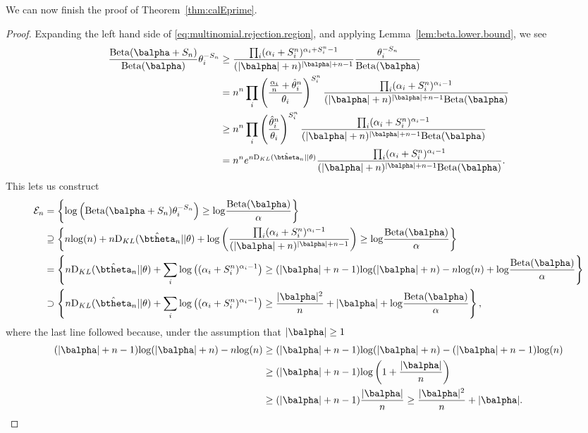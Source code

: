 \documentclass[11pt]{article}
\def\log{{\rm log}}
\newcommand{\Beta}{\mathrm{Beta}}
\newcommand{\KL}{\mathrm{D}_{KL}}
\begin{document}
We can now finish the proof of Theorem~\ref{thm:calEprime}.
\begin{proof}
Expanding the left hand side of \eqref{eq:multinomial.rejection.region}, and applying Lemma~\ref{lem:beta.lower.bound}, we see
\begin{align*}
    \frac{\Beta(\balpha + S_n)}
  {\Beta(\balpha)} \theta_i^{-S_n}
  &\geq
    \frac{ \prod_i (\alpha_i+S_i^n)^{\alpha_i + S_i^n-1}}
    {(|\balpha|+n)^{|\balpha| + n - 1}}
    \frac{ \theta_i^{-S_n}}{\Beta(\balpha)}\\
  &=
    n^n
    \prod_i
    \left(
    \frac{\frac{\alpha_i}{n} + \hat \theta_i^n}{\theta_i}\right)^{S_i^n}
    \frac{
    \prod_i
    (\alpha_i + S_i^n)^{\alpha_i - 1}
    }
    {(|\balpha|+n)^{|\balpha|+n-1}\Beta(\balpha)}\\
  &\geq
    n^n
    \prod_i
    \left(
    \frac{\hat \theta_i^n}{\theta_i}\right)^{S_i^n}
    \frac{
    \prod_i
    (\alpha_i + S_i^n)^{\alpha_i - 1}
    }
    {(|\balpha|+n)^{|\balpha|+n-1}\Beta(\balpha)}\\
  &=
    n^n
    e^{n \KL(\hat\btheta_n|| \theta) }
    \frac{
    \prod_i
    (\alpha_i + S_i^n)^{\alpha_i - 1}
    }
    {(|\balpha|+n)^{|\balpha|+n-1}\Beta(\balpha)}.
\end{align*}
This lets us construct
\begin{align*}
  \mathcal E_n
  &=
  \left\{
    \log \left(
    \Beta(\balpha+S_n) \theta_i^{-S_n}
  \right)
  \geq \log\frac{\Beta(\balpha)}{\alpha}
    \right\}\\
  &\supseteq
    \left\{
        n\log(n)
    +n \KL(\hat\btheta_n|| \theta)
    +
    \log\left(\frac{
    \prod_i
    (\alpha_i + S_i^n)^{\alpha_i - 1}
    }
    {(|\balpha|+n)^{|\balpha|+n-1}}\right)
    \geq
    \log\frac{\Beta(\balpha)}{\alpha}
    \right\}\\
  &=
    \left\{
    n \KL(\hat\btheta_n|| \theta)
    +
    \sum_i\log\left(
    (\alpha_i + S_i^n)^{\alpha_i - 1}
    \right)
    \geq
    (|\balpha|+n-1)\log(|\balpha|+n)
    -n\log(n)
    +\log\frac{\Beta(\balpha)}{\alpha}
    \right\}\\
    &\supset
    \left\{
    n \KL(\hat\btheta_n|| \theta)
    +
    \sum_i\log\left(
    (\alpha_i + S_i^n)^{\alpha_i - 1}
    \right)
    \geq
      \frac{|\balpha|^2}{n} + |\balpha|
    +\log\frac{\Beta(\balpha)}{\alpha}
    \right\},
\end{align*}
where the last line followed because, under the assumption that $|\balpha| \geq 1$
\begin{align*}
    (|\balpha|+n-1)\log(|\balpha|+n)
  -n\log(n)
  &\geq
    (|\balpha|+n-1)\log(|\balpha|+n)
    -(|\balpha|+n-1)\log(n)\\
  &\geq
  (|\balpha|+n-1)
    \log\left(1+\frac{|\balpha|}{n}\right)\\
  &\geq
    (|\balpha|+n-1)\frac{|\balpha|}{n}
    \geq
    \frac{|\balpha|^2}{n} + |\balpha|.
\end{align*}


\end{proof}
\end{document}
